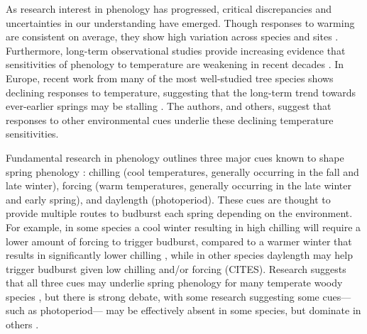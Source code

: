 \documentclass{article}
\begin{document}
\par As research interest in phenology has progressed, critical discrepancies and uncertainties in our understanding have emerged. Though responses to warming are consistent on average, they show high variation across species and sites \citep{Wolkovich:2012n}. Furthermore, long-term observational studies provide increasing evidence that sensitivities of phenology to temperature are weakening in recent decades \citep{Rutishauser:2008,yu2010,fu2015}. In Europe, recent work from many of the most well-studied tree species shows declining responses to temperature, suggesting that the long-term trend towards ever-earlier springs may be stalling \citep{fu2015}. The authors, and others, suggest that responses to other environmental cues underlie these declining temperature sensitivities.

\par Fundamental research in phenology outlines three major cues known to shape spring phenology \citep{chuineJTB}: chilling (cool temperatures, generally occurring in the fall and late winter), forcing (warm temperatures, generally occurring in the late winter and early spring), and daylength (photoperiod). These cues are thought to provide multiple routes to budburst each spring depending on the environment. For example, in some species a cool winter resulting in high chilling will require a lower amount of forcing to trigger budburst, compared to a warmer winter that results in significantly lower chilling \citep{harrington2015}, while in other species daylength may help trigger budburst given low chilling and/or forcing (CITES). Research suggests that all three cues may underlie spring phenology for many temperate woody species \citep{flynn2018,Basler:2014aa,Caffarra:2011qf}, but there is strong debate, with some research suggesting some cues---such as photoperiod--- may be effectively absent in some species, but dominate in others \citep{zohner2016,koerner2010a}. 
\end{document}
